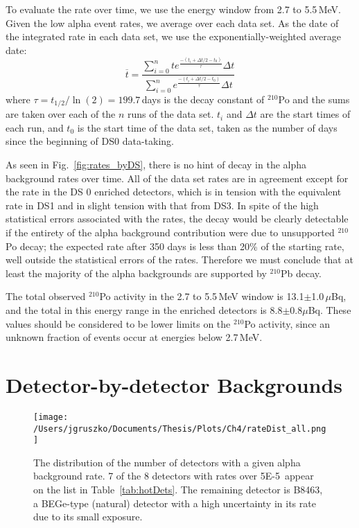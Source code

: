To evaluate the rate over time, we use the energy window from 2.7 to 5.5\,MeV. Given the low alpha event rates, we average over each data set. As the date of the integrated rate in each data set, we use the exponentially-weighted average date:
$$\overline{t} = \frac{\sum_{i=0}^{n}te^{\frac{-(t_i+\Delta t/2-t_0)}{\tau}}\Delta t }{\sum_{i=0}^{n}e^{\frac{-(t_i+\Delta t/2-t_0)}{\tau}}\Delta t} $$
where $\tau = t_{1/2}/\ln(2) = 199.7$\,days is the decay constant of $^{210}$Po and the sums are taken over each of the $n$ runs of the data set. $t_i$ and $\Delta t$ are the start times of each run, and $t_0$ is the start time of the data set, taken as the number of days since the beginning of DS0 data-taking. 

As seen in Fig.~\ref{fig:rates_byDS}, there is no hint of decay in the alpha background rates over time. All of the data set rates are in agreement except for the rate in the DS 0 enriched detectors, which is in tension with the equivalent rate in DS1 and in slight tension with that from DS3. In spite of the high statistical errors associated with the rates, the decay would be clearly detectable if the entirety of the alpha background contribution were due to unsupported $^{210}$Po decay; the expected rate after 350 days is less than 20\% of the starting rate, well outside the statistical errors of the rates. Therefore we must conclude that at least the majority of the alpha backgrounds are supported by $^{210}$Pb decay. 

The total observed $^{210}$Po activity in the 2.7 to 5.5\,MeV window is 13.1$\pm$1.0\,$\mu$Bq, and the total in this energy range in the enriched detectors is 8.8$\pm$0.8$\mu$Bq. These values should be considered to be lower limits on the $^{210}$Po activity, since an unknown fraction of events occur at energies below 2.7\,MeV. 

\section{Detector-by-detector Backgrounds}

\begin{figure}[t]
  \centering
 \texttt{[image: /Users/jgruszko/Documents/Thesis/Plots/Ch4/rateDist\_all.png]}
\caption[The distribution of alpha background rates]{The distribution of the number of detectors with a given alpha background rate. 7 of the 8 detectors with rates over 5E-5\cpKkgd\ appear on the list in Table~\ref{tab:hotDets}. The remaining detector is B8463, a BEGe-type (natural) detector with a high uncertainty in its rate due to its small exposure.}
\label{fig:rateDist}
\end{figure}

